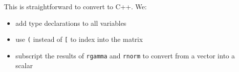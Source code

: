 \begin{Shaded}
\begin{Highlighting}[]
\StringTok{ }
\StringTok{ }\NormalTok{(} \NormalTok{)}
\StringTok{ }\StringTok{ }

   \OperatorTok{:}
     \OperatorTok{:}
\StringTok{ }\NormalTok{(}\NormalTok{, }\OperatorTok{*}\StringTok{ }\OperatorTok{+}\StringTok{ }\NormalTok{)}
\StringTok{ }\NormalTok{(}\NormalTok{, } \OperatorTok{/}\StringTok{ }\OperatorTok{+}\StringTok{ }\NormalTok{), } \OperatorTok{/}\StringTok{ }\NormalTok{(} \OperatorTok{*}\StringTok{ }\OperatorTok{+}\StringTok{ }\NormalTok{)))}
\NormalTok{    \}}
\StringTok{ }
\NormalTok{  \}}
\NormalTok{\}}
\end{Highlighting}
\end{Shaded}

This is straightforward to convert to C++. We:

\begin{itemize}
\item
  add type declarations to all variables
\item
  use \texttt{(} instead of \texttt{{[}} to index into the matrix
\item
  subscript the results of \texttt{rgamma} and \texttt{rnorm} to convert
  from a vector into a scalar
\end{itemize}

